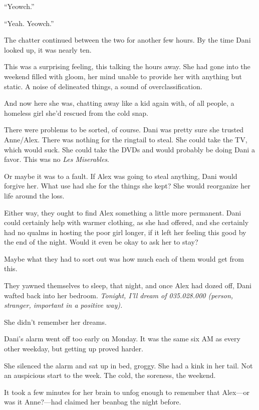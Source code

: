 ``Yeowch.''

``Yeah. Yeowch.''

The chatter continued between the two for another few hours. By the time Dani looked up, it was nearly ten.

This was a surprising feeling, this talking the hours away. She had gone into the weekend filled with gloom, her mind unable to provide her with anything but static. A noise of delineated things, a sound of overclassification.

And now here she was, chatting away like a kid again with, of all people, a homeless girl she'd rescued from the cold snap.

There were problems to be sorted, of course. Dani was pretty sure she trusted Anne/Alex. There was nothing for the ringtail to steal. She could take the TV, which would suck. She could take the DVDs and would probably be doing Dani a favor. This was no \emph{Les Miserables}.

Or maybe it was to a fault. If Alex was going to steal anything, Dani would forgive her. What use had she for the things she kept? She would reorganize her life around the loss.

Either way, they ought to find Alex something a little more permanent. Dani could certainly help with warmer clothing, as she had offered, and she certainly had no qualms in hosting the poor girl longer, if it left her feeling this good by the end of the night. Would it even be okay to ask her to stay?

Maybe what they had to sort out was how much each of them would get from this.

They yawned themselves to sleep, that night, and once Alex had dozed off, Dani wafted back into her bedroom. \emph{Tonight, I'll dream of 035.028.000 (person, stranger, important in a positive way).}

She didn't remember her dreams.

\secdiv{}

\noindent Dani's alarm went off too early on Monday. It was the same six AM as every other weekday, but getting up proved harder.

She silenced the alarm and sat up in bed, groggy. She had a kink in her tail. Not an auspicious start to the week. The cold, the soreness, the weekend.

It took a few minutes for her brain to unfog enough to remember that Alex---or was it Anne?---had claimed her beanbag the night before.

